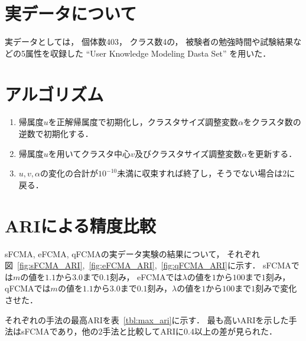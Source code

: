 \documentclass[a4j,12pt,dvipdfmx,oneside]{jsbook}
\theoremstyle{definition}
\begin{document}
 \section{実データについて}\label{sec:about_real_data}
 実データとしては，
 個体数403，
 クラス数4の，
 被験者の勉強時間や試験結果などの5属性を収録した
 ``User Knowledge Modeling Dasta Set''
 を用いた．
 
 \section{アルゴリズム}\label{sec:real_data_algorythm} 
  \begin{enumerate}
   \item 帰属度$u$を正解帰属度で初期化し，クラスタサイズ調整変数$\alpha$をクラスタ数の逆数で初期化する．
   \item 帰属度$u$を用いてクラスタ中心$v$及びクラスタサイズ調整変数$\alpha$を更新する．
   \item $u, v, \alpha$の変化の合計が$10^{-10}$未満に収束すれば終了し，そうでない場合は$2$に戻る．
  \end{enumerate}
  
 \section{ARIによる精度比較}\label{sec:ari_compare}

  sFCMA, eFCMA, qFCMAの実データ実験の結果について，
  それぞれ図~\ref{fig:sFCMA_ARI},~\ref{fig:eFCMA_ARI},~\ref{fig:qFCMA_ARI}に示す．
  sFCMAでは$m$の値を$1.1$から$3.0$まで$0.1$刻み，
  eFCMAでは$\lambda$の値を$1$から$100$まで$1$刻み，
  qFCMAでは$m$の値を$1.1$から$3.0$まで$0.1$刻み，$\lambda$の値を$1$から$100$まで$1$刻みで変化させた．
  
  それぞれの手法の最高ARIを表~\ref{tbl:max_ari}に示す．
  最も高いARIを示した手法はsFCMAであり，他の$2$手法と比較してARIに$0.4$以上の差が見られた．
 
\end{document}
